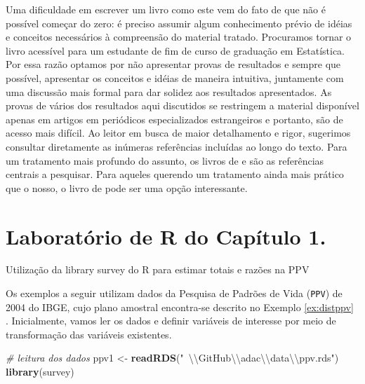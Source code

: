 \documentclass[]{book}
\newenvironment{Shaded}{\begin{snugshade}}{\end{snugshade}}
\newcommand{\KeywordTok}[1]{\textcolor[rgb]{0.13,0.29,0.53}{\textbf{{#1}}}}
\newcommand{\CharTok}[1]{\textcolor[rgb]{0.31,0.60,0.02}{{#1}}}
\newcommand{\StringTok}[1]{\textcolor[rgb]{0.31,0.60,0.02}{{#1}}}
\newcommand{\CommentTok}[1]{\textcolor[rgb]{0.56,0.35,0.01}{\textit{{#1}}}}
\newcommand{\NormalTok}[1]{{#1}}
\theoremstyle{definition}
\theoremstyle{definition}
\theoremstyle{remark}
\let\BeginKnitrBlock\begin \let\EndKnitrBlock\end
\begin{document}
Uma dificuldade em escrever um livro como este vem do fato de que não é
possível começar do zero: é preciso assumir algum conhecimento prévio de
idéias e conceitos necessários à compreensão do material tratado.
Procuramos tornar o livro acessível para um estudante de fim de curso de
graduação em Estatística. Por essa razão optamos por não apresentar
provas de resultados e sempre que possível, apresentar os conceitos e
idéias de maneira intuitiva, juntamente com uma discussão mais formal
para dar solidez aos resultados apresentados. As provas de vários dos
resultados aqui discutidos se restringem a material disponível apenas em
artigos em periódicos especializados estrangeiros e portanto, são de
acesso mais difícil. Ao leitor em busca de maior detalhamento e rigor,
sugerimos consultar diretamente as inúmeras referências incluídas ao
longo do texto. Para um tratamento mais profundo do assunto, os livros
de \citep{SHS89} e \citep{CHSK2003} são as referências centrais a
pesquisar. Para aqueles querendo um tratamento ainda mais prático que o
nosso, o livro de \citep{lethonen} pode ser uma opção interessante.

\section{Laboratório de R do Capítulo 1.}\label{epa}

\BeginKnitrBlock{example}
\protect\hypertarget{ex:unnamed-chunk-1}{}{\label{ex:unnamed-chunk-1}}Utilização
da library survey do R para estimar totais e razões na PPV
\EndKnitrBlock{example} Os exemplos a seguir utilizam dados da Pesquisa
de Padrões de Vida (\texttt{PPV}) de 2004 do IBGE, cujo plano amostral
encontra-se descrito no Exemplo \ref{ex:distppv} . Inicialmente, vamos
ler os dados e definir variáveis de interesse por meio de transformação
das variáveis existentes.

\begin{Shaded}
\begin{Highlighting}[]
\CommentTok{# leitura dos dados}
\NormalTok{ppv1 <-}\StringTok{ }\KeywordTok{readRDS}\NormalTok{(}\StringTok{"~}\CharTok{\textbackslash{}\textbackslash{}}\StringTok{GitHub}\CharTok{\textbackslash{}\textbackslash{}}\StringTok{adac}\CharTok{\textbackslash{}\textbackslash{}}\StringTok{data}\CharTok{\textbackslash{}\textbackslash{}}\StringTok{ppv.rds"}\NormalTok{)}
\KeywordTok{library}\NormalTok{(survey)}
\end{Highlighting}
\end{Shaded}
\end{document}
